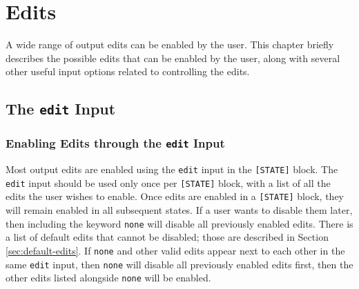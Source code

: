 \section{Edits} \label{chap:edits}

A wide range of output edits can be enabled by the user.  This chapter briefly describes the possible edits that can be enabled by the user, along with several other useful input options related to controlling the edits.

\subsection{The \texttt{edit} Input}

\subsubsection{Enabling Edits through the \texttt{edit} Input}

Most output edits are enabled using the \texttt{edit} input in the \texttt{[STATE]} block.  The \texttt{edit} input should be used only once per \texttt{[STATE]} block, with a list of all the edits the user wishes to enable.  Once edits are enabled in a \texttt{[STATE]} block, they will remain enabled in all subsequent states.  If a user wants to disable them later, then including the keyword \texttt{none} will disable all previously enabled edits.  There is a list of default edits that cannot be disabled; those are described in Section \ref{sec:default-edits}.  If \texttt{none} and other valid edits appear next to each other in the same \texttt{edit} input, then \texttt{none} will disable all previously enabled edits first, then the other edits listed alongside \texttt{none} will be enabled.

